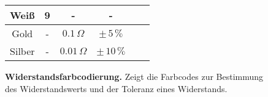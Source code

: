 {\begin{figure}[H]
\begin{minipage}[b]{1\textwidth}
{\begin{tabular}{|c|c|c|c|c|c|}
                \hline %
                Weiß & 9 & - & - \\ %
                \hline %
                \cellcolor{gold}Gold & - & $0.1\,\Omega$ & $\pm\,5\,\%$ \\ %
                \hline %
                \cellcolor{silver}Silber & - & $0.01\,\Omega$ & $\pm\,10\,\%$ \\ %
                \hline %
            \end{tabular}%
            }
        \end{minipage}
        \caption{\textbf{Widerstandsfarbcodierung.} Zeigt die Farbcodes zur Bestimmung des Widerstandswerts und der Toleranz eines Widerstands.}
        \label{fig:Farbkodierung vom Widerstand}
    \end{figure}

}%





